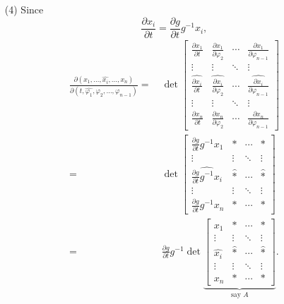 \documentclass{article}
\begin{document}
\begin{enumerate}
\item[(4)]
  Since
  \[
    \frac{\partial x_i}{\partial t}
    = \frac{\partial g}{\partial t} g^{-1} x_i,
  \]
  \begin{align*}
    \frac{\partial(x_1,\ldots,\widehat{x_i},\ldots,x_n)}
      {\partial(t,\widehat{\varphi_1}, \varphi_2,\ldots,\varphi_{n-1})}
    =& \: \det
    \begin{bmatrix}
      \frac{\partial x_1}{\partial t}
        & \frac{\partial x_1}{\partial \varphi_2}
        & \cdots
        & \frac{\partial x_1}{\partial \varphi_{n-1}} \\
      \vdots & \vdots & \ddots & \vdots \\
      \widehat{\frac{\partial x_i}{\partial t}}
        & \widehat{\frac{\partial x_i}{\partial \varphi_2}}
        & \cdots
        & \widehat{\frac{\partial x_i}{\partial \varphi_{n-1}}} \\
      \vdots & \vdots & \ddots & \vdots \\
      \frac{\partial x_n}{\partial t}
        & \frac{\partial x_n}{\partial \varphi_2}
        & \cdots
        & \frac{\partial x_n}{\partial \varphi_{n-1}}
    \end{bmatrix} \\
    =& \:
    \det
    \begin{bmatrix}
      \frac{\partial g}{\partial t} g^{-1} x_1
        & *
        & \cdots
        & * \\
      \vdots & \vdots & \ddots & \vdots \\
      \widehat{\frac{\partial g}{\partial t} g^{-1} x_i}
        & \widehat{*}
        & \cdots
        & \widehat{*} \\
      \vdots & \vdots & \ddots & \vdots \\
      \frac{\partial g}{\partial t} g^{-1} x_n
        & *
        & \cdots
        & *
    \end{bmatrix} \\
    =& \:
    \frac{\partial g}{\partial t} g^{-1}
    \det
    \underbrace{\begin{bmatrix}
      x_1
        & *
        & \cdots
        & * \\
      \vdots & \vdots & \ddots & \vdots \\
      \widehat{x_i}
        & \widehat{*}
        & \cdots
        & \widehat{*} \\
      \vdots & \vdots & \ddots & \vdots \\
      x_n
        & *
        & \cdots
        & *
    \end{bmatrix}}_{\text{say $A$}}.

\end{align*}
\end{enumerate}
\end{document}
